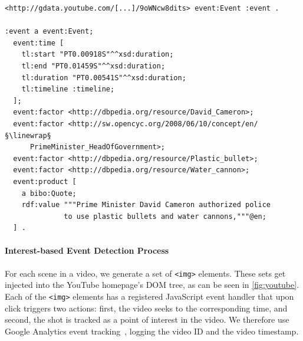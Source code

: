 \documentclass[runningheads,a4paper]{llncs}
\newcommand{\linewrap}{\raisebox{-.6ex}{\textcolor{grey}{$\hookleftarrow$}}}
\begin{document}
\begin{lstlisting}[caption=Exemplary extracted named entities from a YouTube video on the London riots., label=code:semwebvid, float=h, escapechar=§]
<http://gdata.youtube.com/[...]/9oWNcw8dits> event:Event :event .

:event a event:Event;
  event:time [
    tl:start "PT0.00918S"^^xsd:duration;
    tl:end "PT0.01459S"^^xsd:duration;
    tl:duration "PT0.00541S"^^xsd:duration;
    tl:timeline :timeline;
  ];
  event:factor <http://dbpedia.org/resource/David_Cameron>;
  event:factor <http://sw.opencyc.org/2008/06/10/concept/en/§\linewrap§
      PrimeMinister_HeadOfGovernment>;
  event:factor <http://dbpedia.org/resource/Plastic_bullet>;
  event:factor <http://dbpedia.org/resource/Water_cannon>;
  event:product [
    a bibo:Quote;
    rdf:value """Prime Minister David Cameron authorized police
              to use plastic bullets and water cannons,"""@en;
  ] .
\end{lstlisting} 

\paragraph{Interest-based Event Detection Process}
For each scene in a video, we generate a set of \texttt{<img>} elements. These sets get injected into the YouTube homepage's DOM tree, as can be seen in \autoref{fig:youtube}. Each of the \texttt{<img>} elements has a registered JavaScript event handler that upon click triggers two actions: first, the video seeks to the corresponding time, and second, the shot is tracked as a point of interest in the video. We therefore use Google Analytics event tracking~\cite{analyticsevent}, logging the video ID and the video timestamp.
\end{document}
